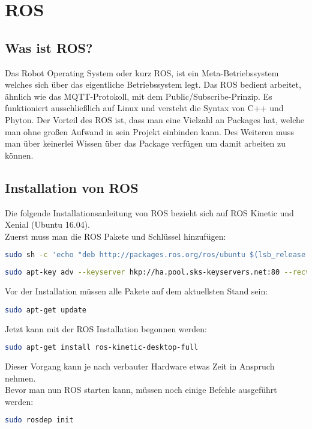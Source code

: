 \section{ROS}

\subsection{Was ist ROS?}
Das Robot Operating System oder kurz ROS, ist ein Meta-Betriebssystem welches sich über das eigentliche Betriebssystem legt. Das ROS bedient arbeitet, ähnlich wie das MQTT-Protokoll, mit dem Public/Subscribe-Prinzip. Es funktioniert ausschließlich auf Linux und versteht die Syntax von C++ und Phyton. 
Der Vorteil des ROS ist, dass man eine Vielzahl an Packages hat, welche man ohne großen Aufwand in sein Projekt einbinden kann. Des Weiteren muss man über keinerlei Wissen über das Package verfügen um damit arbeiten zu können.

\subsection{Installation von ROS}
Die folgende Installationsanleitung von ROS bezieht sich auf ROS Kinetic und Xenial (Ubuntu 16.04).\\
Zuerst muss man die ROS Pakete und Schlüssel hinzufügen:
\begin{lstlisting}[language=bash]
sudo sh -c 'echo "deb http://packages.ros.org/ros/ubuntu $(lsb_release -sc) main" > /etc/apt/sources.list.d/ros-latest.list'
\end{lstlisting}

\begin{lstlisting}[language=bash]
sudo apt-key adv --keyserver hkp://ha.pool.sks-keyservers.net:80 --recv-key 421C365BD9FF1F717815A3895523BAEEB01FA116
\end{lstlisting}
Vor der Installation müssen alle Pakete auf dem aktuellsten Stand sein:
\begin{lstlisting}[language=bash]
sudo apt-get update
\end{lstlisting}
Jetzt kann mit der ROS Installation begonnen werden:
\begin{lstlisting}[language=bash]
sudo apt-get install ros-kinetic-desktop-full
\end{lstlisting}
Dieser Vorgang kann je nach verbauter Hardware etwas Zeit in Anspruch nehmen.\\
Bevor man nun ROS starten kann, müssen noch einige Befehle ausgeführt werden:
\begin{lstlisting}[language=bash]
sudo rosdep init
\end{lstlisting}

